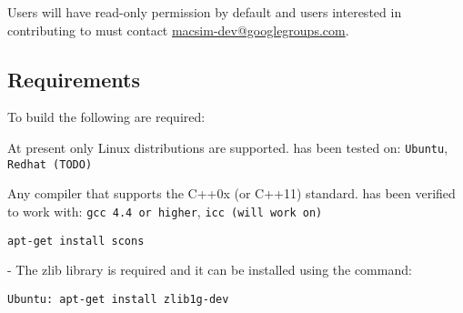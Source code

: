 Users will have read-only permission by default and users interested
in contributing to \SIM must contact
\href{mailto:macsim-dev@googlegroups.com}{macsim-dev@googlegroups.com}.



\subsection{Requirements}

To build \SIM the following are required:

\begingroup
\renewcommand\descriptionlabel[1]{\textit{\hspace\labelsep{#1}}}
\begin{description}\firmlist
  \item[Operating System] At present only Linux distributions are supported. \SIM has been tested on:
   \Verb+Ubuntu+, \Verb+Redhat (TODO)+
  \item[Compiler] Any compiler that supports the C++0x (or C++11)
    standard. \SIM has been verified to work with: \Verb+gcc 4.4 or higher+, \Verb+icc (will work on)+
  \item[SConstruct]

    \Verb+apt-get install scons+

  \item[Libraries] - The zlib library is required and it can be installed using the command:
\begin{Verbatim}
Ubuntu: apt-get install zlib1g-dev
\end{Verbatim}
\end{description}
\endgroup




